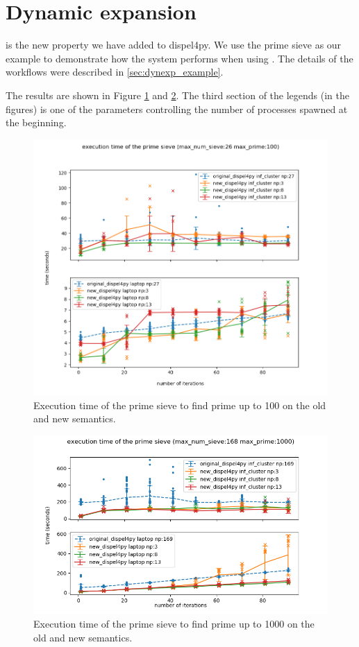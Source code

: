 \section{Dynamic expansion}
\tDynexp is the new property we have added to dispel4py. We use the prime sieve as our example to demonstrate how the system performs when using \tdynexp. The details of the workflows were described in \ref{sec:dynexp_example}.

The results are shown in Figure \ref{fig:sieve_opt_100} and \ref{fig:sieve_opt_1000}. The third section of the legends (in the figures) is one of the parameters controlling the number of processes spawned at the beginning.

\begin{figure}[h]
\centering
    \includegraphics[width=1\textwidth]{figures/sieve_opt1_100}
\caption{Execution time of the prime sieve to find prime up to 100 on the old and new semantics.}
\label{fig:sieve_opt_100}
\end{figure}

\begin{figure}[h]
\centering
    \includegraphics[width=1\textwidth]{figures/sieve_opt1_1000}
\caption{Execution time of the prime sieve to find prime up to 1000 on the old and new semantics.}
\label{fig:sieve_opt_1000}
\end{figure}

